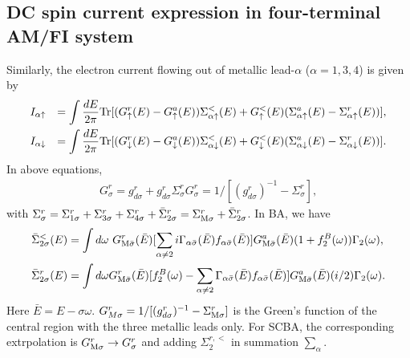 \documentclass[aps,prb,superscriptaddress]{revtex4-2}
\begin{document}
\subsection{DC spin current expression in four-terminal AM/FI system}
Similarly, the electron current flowing out of metallic lead-$\alpha$ ($\alpha=1, 3, 4$) is given by
\begin{eqnarray}
I_{\alpha\uparrow} &&= \int \frac{dE}{2\pi} {\rm Tr} [(G_{\uparrow}^r(E)-G_{\uparrow}^a(E))\Sigma^<_{\alpha\uparrow}(E)+G_{\uparrow}^<(E) (\Sigma_{\alpha\uparrow}^a(E) -\Sigma_{\alpha\uparrow}^r(E))],\\
I_{\alpha\downarrow} &&= \int \frac{dE}{2\pi} {\rm Tr} [(G_{\downarrow}^r(E)-G_{\downarrow}^a(E))\Sigma^<_{\alpha\downarrow}(E)+G_{\downarrow}^<(E) (\Sigma_{\alpha\downarrow}^a(E) -\Sigma_{\alpha\downarrow}^r(E))].
\end{eqnarray}
In above equations, 
\begin{eqnarray}
G^r_{\sigma} =g^r_{d\sigma} + g^r_{d\sigma} \Sigma_{\sigma}^r G^r_{\sigma} = 1/[(g^r_{d\sigma})^{-1} - \Sigma_{\sigma}^r],
\end{eqnarray}
with $\Sigma_{\sigma}^r = \Sigma_{1\sigma}^r + \Sigma_{3\sigma}^r  + \Sigma_{4\sigma}^r + {\bar \Sigma}_{2\sigma}^r=\Sigma_{{\rm M}\sigma}^r+\bar\Sigma_{2\sigma}^r$. In BA, we have
\begin{eqnarray}
{\bar \Sigma}^<_{2\sigma}(E) &= \int d\omega ~ G^r_{{\rm M}\bar\sigma}({\bar E})[\sum_{\alpha\neq 2} i \Gamma_{\alpha\bar\sigma}({\bar E}) f_{\alpha\bar\sigma}({\bar E})] G^a_{{\rm M}\bar\sigma}({\bar E})(1+f_2^B(\omega)) \Gamma_2(\omega),\label{eq:less} \\
{\bar \Sigma}^r_{2\sigma}(E)&= \int d\omega G^r_{{\rm M}\bar\sigma}({\bar E})[f^B_2(\omega)-\sum_{\alpha\neq 2}\Gamma_{\alpha\bar\sigma}({\bar E}) f_{\alpha\bar\sigma}({\bar E})]G^a_{{\rm M}\bar\sigma}({\bar E})(i/2)\Gamma_2(\omega).\label{eq:r}
\end{eqnarray}
Here $\bar E=E-\sigma \omega$. $G_{M\sigma}^r=1/[(g^r_{d\sigma})^{-1} - \Sigma_{{\rm M}\sigma}^r]$ is the Green's function of the central region with the three metallic leads only. For SCBA, the corresponding extrpolation is $G_{{\rm M}\sigma}^r \to G_{\sigma}^r$ and adding $\Sigma_2^{r,<}$ in summation $\sum_{\alpha}$.
\end{document}
